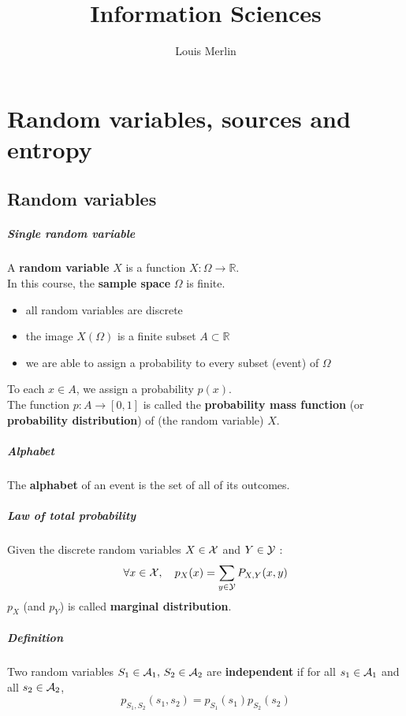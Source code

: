 \documentclass[1Opt]{report}
\author{Louis Merlin}
\begin{document}
\title{Information Sciences}
\maketitle

\tableofcontents

\chapter{Random variables, sources and entropy}
\section{Random variables}

\paragraph{Single random variable}
A \textbf{random variable} $X$ is a function $X:\Omega\rightarrow{\mathbb R}$.\\
In this course, the \textbf{sample space} $\Omega$ is finite.\\
\begin{itemize}
  \item all random variables are discrete
  \item the image $X(\Omega)$ is a finite subset $A\subset{\mathbb R}$
  \item we are able to assign a probability to every subset (event) of $\Omega$
\end{itemize}
To each $x\in A$, we assign a probability $p(x)$.\\
The function $p:A\rightarrow [0,1]$ is called the \textbf{probability mass
function} (or \textbf{probability distribution}) of (the random variable) $X$.

\paragraph{Alphabet}
The \textbf{alphabet} of an event is the set of all of its outcomes.

\paragraph{Law of total probability}
Given the discrete random variables $X\in{\cal X}$ and $Y\in{\cal Y}$ :
\[ \forall x\in{\cal X},\quad p_X(x)=\sum_{y\in{\cal Y}}P_{X,Y}(x,y)\]
$p_X$ (and $p_Y$) is called \textbf{marginal distribution}.

\paragraph{Definition}
Two random variables $S_1\in {\cal A}_1,\,S_2\in{\cal A}_2$ are \textbf{independent} if
for all $s_1\in{\cal A}_1$ and all $s_2\in{\cal A}_2$,
\[ p_{S_1,S_2}(s_1,s_2)=p_{S_1}(s_1)p_{S_2}(s_2)\]
\end{document}
